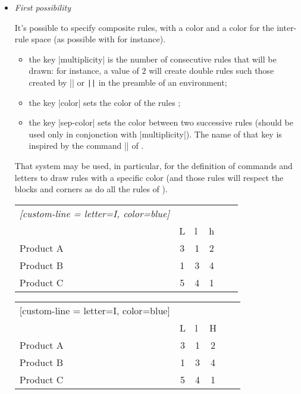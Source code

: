 \documentclass[dvipsnames]{article}%
\begin{document}
\begin{itemize}
\item \emph{First possibility}\par\nobreak

It's possible to specify composite rules, with a color and a color for the
inter-rule space (as possible with  for instance).

\begin{itemize}
\item the key |multiplicity| is the number of consecutive rules that will be
drawn: for instance, a value of $2$ will create double rules such those
created by |\hline\hline| or \verb+||+ in the preamble of an environment;

\item the key |color| sets the color of the rules ;

\item the key |sep-color| sets the color between two successive rules (should be
used only in conjonction with |multiplicity|). The name of that key is inspired
by the command |\doublerulesepcolor| of .
\end{itemize}

\medskip
That system may be used, in particular, for the definition of commands and
letters to draw rules with a specific color (and those rules will respect the
blocks and corners as do all the rules of ). 

\medskip
\begin{Code}
\begin{NiceTabular}{lcIcIc}\emph{[custom-line = {letter=I, color=blue}]}
\hline
          &  \\
          & L & l & h \\
\hline
Product A & 3 & 1 & 2 \\
Product B & 1 & 3 & 4 \\
Product C & 5 & 4 & 1 \\
\hline
\end{NiceTabular}
\end{Code}


\begin{center}
\begin{NiceTabular}{lcIcIc}[custom-line = {letter=I, color=blue}]
\hline
          &  \\
          & L & l & H \\
\hline
Product A & 3 & 1 & 2 \\
Product B & 1 & 3 & 4 \\
Product C & 5 & 4 & 1 \\
\hline
\end{NiceTabular}
\end{center}



\end{itemize}
\end{document}
